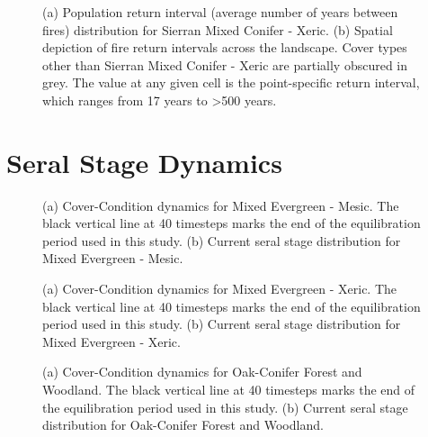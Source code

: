 \begin{figure}[!htbp]
  \centering
  \caption{(a) Population return interval (average number of years between fires) distribution for Sierran Mixed Conifer - Xeric.  (b) Spatial depiction of fire return intervals across the landscape. Cover types other than Sierran Mixed Conifer - Xeric are partially obscured in grey. The value at any given cell is the point-specific return interval, which ranges from 17 years to \textgreater 500 years.}
\label{fig:preturn_smcx_app}
\end{figure}

\clearpage

\section{Seral Stage Dynamics}
\label{app:sec:seraldynamics}

\begin{figure}[!htbp]
  \centering
  \caption{(a) Cover-Condition dynamics for Mixed Evergreen - Mesic. The black vertical line at 40 timesteps marks the end of the equilibration period used in this study. (b) Current seral stage distribution for Mixed Evergreen - Mesic.}
\label{fig:covcond_megm}
\end{figure}

\begin{figure}[!htbp]
  \centering
  \caption{(a) Cover-Condition dynamics for Mixed Evergreen - Xeric. The black vertical line at 40 timesteps marks the end of the equilibration period used in this study. (b) Current seral stage distribution for Mixed Evergreen - Xeric.} 
  \label{fig:covcond_megx}
\end{figure}

\begin{figure}[!htbp]
  \centering
  \caption{(a) Cover-Condition dynamics for Oak-Conifer Forest and Woodland. The black vertical line at 40 timesteps marks the end of the equilibration period used in this study. (b) Current seral stage distribution for Oak-Conifer Forest and Woodland.} 
  \label{fig:covcond_ocfw}
\end{figure}

